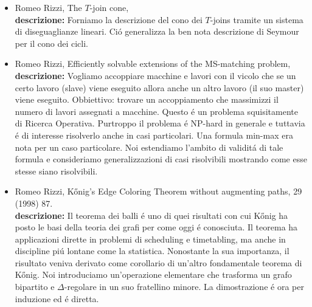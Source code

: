 \documentclass[10pt]{article}
\begin{document}
\begin{itemize}
  \vspace{1.4mm}
  \item[] {\sc Romeo Rizzi},
   \newblock  The $T$-join cone,
   \\
{\bf descrizione:}
Forniamo la descrizione del cono
dei $T$-joins tramite un sistema di diseguaglianze
lineari. Ci\'o generalizza la ben nota
descrizione di Seymour per il cono dei cicli.\\

  \vspace{1.4mm}
  \item[] {\sc Romeo Rizzi},
   \newblock  Efficiently solvable extensions of the MS-matching problem,
   \\
{\bf descrizione:}
Vogliamo accoppiare macchine e lavori con
il vicolo che se un certo lavoro (slave)
viene eseguito allora anche un altro lavoro (il suo master)
viene eseguito.
Obbiettivo: trovare un accoppiamento che massimizzi il numero
di lavori assegnati a macchine.
Questo \'e un problema squisitamente di Ricerca Operativa.
Purtroppo il problema \'e NP-hard in generale
e tuttavia \'e di interesse risolverlo anche in casi
particolari.
Una formula min-max era nota per un caso particolare.
Noi estendiamo l'ambito di validit\'a di tale formula
e consideriamo generalizzazioni di casi risolvibili
mostrando come esse stesse siano risolvibili.\\

  \vspace{1.4mm}
  \item[] {\sc Romeo Rizzi},
   \newblock  K\H{o}nig's Edge Coloring Theorem without augmenting paths,
    29 (1998) 87.\\
{\bf descrizione:}
Il teorema dei balli \'e uno di
quei risultati con cui K\H{o}nig
ha posto le basi della teoria dei grafi per come oggi \'e conosciuta.
Il teorema ha applicazioni dirette in problemi di scheduling e timetabling,
ma anche in discipline pi\'u lontane come la statistica.
Nonostante la sua importanza, il risultato veniva derivato
come corollario di un'altro fondamentale teorema di K\H{o}nig.
Noi introduciamo  un'operazione elementare che
trasforma un grafo bipartito e $\Delta$-regolare
in un suo fratellino minore.
La dimostrazione \'e ora per induzione
ed \'e diretta.\\


\end{itemize}
\end{document}
